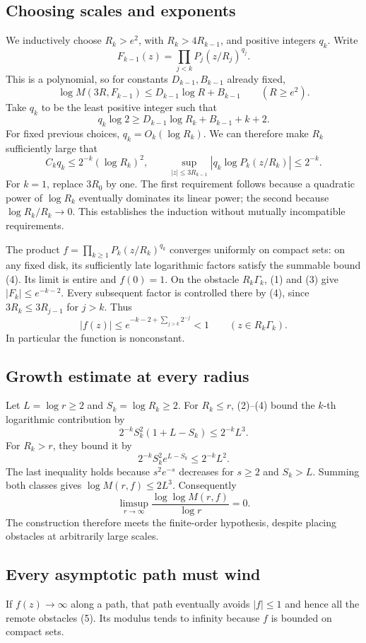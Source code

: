 \subsection*{Choosing scales and exponents}
We inductively choose $R_k>e^2$, with $R_k>4R_{k-1}$, and positive integers $q_k$. Write
\[
 F_{k-1}(z)=\prod_{j<k}P_j(z/R_j)^{q_j}.
\]
This is a polynomial, so for constants $D_{k-1},B_{k-1}$ already fixed,
\[
 \log M(3R,F_{k-1})\le D_{k-1}\log R+B_{k-1}\qquad(R\ge e^2).
\]
Take $q_k$ to be the least positive integer such that
\[
 q_k\log2\ge D_{k-1}\log R_k+B_{k-1}+k+2.
 \tag{3}
\]
For fixed previous choices, $q_k=O_k(\log R_k)$. We can therefore make $R_k$ sufficiently large that
\[
 C_kq_k\le2^{-k}(\log R_k)^2,\qquad
 \sup_{|z|\le3R_{k-1}}|q_k\log P_k(z/R_k)|\le2^{-k}.
 \tag{4}
\]
For $k=1$, replace $3R_0$ by one. The first requirement follows because a quadratic power of $\log R_k$ eventually dominates its linear power; the second because $\log R_k/R_k\to0$. This establishes the induction without mutually incompatible requirements.

The product $f=\prod_{k\ge1}P_k(z/R_k)^{q_k}$ converges uniformly on compact sets: on any fixed disk, its sufficiently late logarithmic factors satisfy the summable bound (4). Its limit is entire and $f(0)=1$.
On the obstacle $R_k\Gamma_k$, (1) and (3) give $|F_k|\le e^{-k-2}$. Every subsequent factor is controlled there by (4), since $3R_k\le3R_{j-1}$ for $j>k$. Thus
\[
 |f(z)|\le e^{-k-2+\sum_{j>k}2^{-j}}<1
 \qquad(z\in R_k\Gamma_k).
 \tag{5}
\]
In particular the function is nonconstant.

\subsection*{Growth estimate at every radius}
Let $L=\log r\ge2$ and $S_k=\log R_k\ge2$. For $R_k\le r$, (2)--(4) bound the $k$-th logarithmic contribution by
\[
 2^{-k}S_k^2(1+L-S_k)\le2^{-k}L^3.
\]
For $R_k>r$, they bound it by
\[
 2^{-k}S_k^2e^{L-S_k}\le2^{-k}L^2.
\]
The last inequality holds because $s^2e^{-s}$ decreases for $s\ge2$ and $S_k>L$. Summing both classes gives $\log M(r,f)\le2L^3$. Consequently
\[
 \limsup_{r\to\infty}\frac{\log\log M(r,f)}{\log r}=0.
\]
The construction therefore meets the finite-order hypothesis, despite placing obstacles at arbitrarily large scales.

\subsection*{Every asymptotic path must wind}
If $f(z)\to\infty$ along a path, that path eventually avoids $|f|\le1$ and hence all the remote obstacles (5). Its modulus tends to infinity because $f$ is bounded on compact sets.

